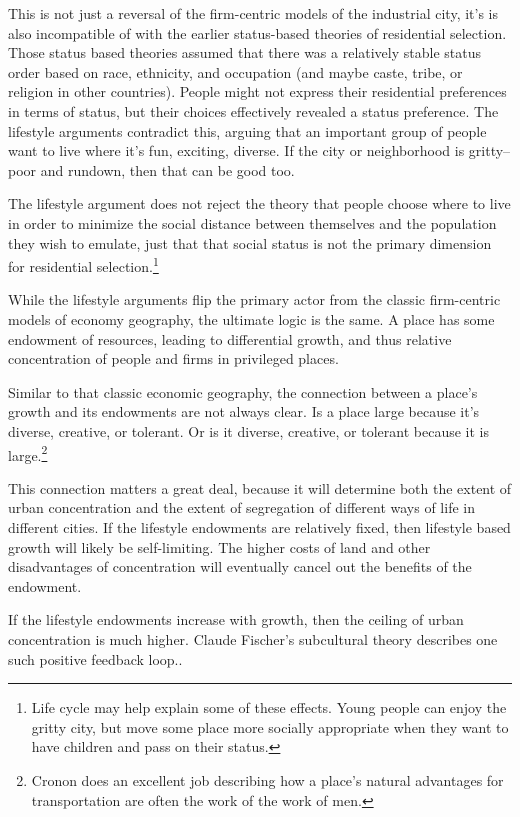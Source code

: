 This is not just a reversal of the firm-centric models of the
industrial city, it's is also incompatible of with the earlier
status-based theories of residential selection. Those status based
theories assumed that there was a relatively stable status order based
on race, ethnicity, and occupation (and maybe caste, tribe, or
religion in other countries). People might not express their
residential preferences in terms of status, but their choices
effectively revealed a status preference. The lifestyle arguments
contradict this, arguing that an important group of people want to
live where it's fun, exciting, diverse. If the city or neighborhood is
gritty--poor and rundown, then that can be good too.

The lifestyle argument does not reject the theory that people choose
where to live in order to minimize the social distance between
themselves and the population they wish to emulate, just that that
social status is not the primary dimension for residential
selection.\footnote{Life cycle may help explain some of these
  effects. Young people can enjoy the gritty city, but move some place
  more socially appropriate when they want to have children and pass
  on their status.\cite{berry_human_1974}} 

While the lifestyle arguments flip the primary actor from the classic
firm-centric models of economy geography, the ultimate logic is the
same. A place has some endowment of resources, leading to differential
growth, and thus relative concentration of people and firms in 
privileged places.

Similar to that classic economic geography, the connection between a
place's growth and its endowments are not always clear. Is a place
large because it's diverse, creative, or tolerant. Or is it diverse,
creative, or tolerant because it is large.\footnote{Cronon does an
  excellent job describing how a place's natural advantages for
  transportation are often the work of the work of men.\cite{cronon_natures_1992}}

This connection matters a great deal, because it will determine both
the extent of urban concentration and the extent of segregation of
different ways of life in different cities. If the lifestyle
endowments are relatively fixed, then lifestyle based growth will
likely be self-limiting. The higher costs of land and other
disadvantages of concentration will eventually cancel out the benefits
of the endowment.

If the lifestyle endowments increase with growth, then the ceiling of
urban concentration is much higher. Claude Fischer's subcultural
theory describes one such positive feedback loop..

